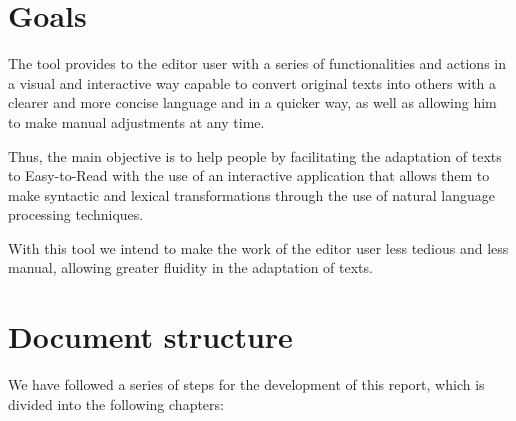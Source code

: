 \section{Goals}
The tool provides to the editor user with a series of functionalities and actions in a visual and interactive way capable to convert original texts into others with a clearer and more concise language and in a quicker way, as well as allowing him to make manual adjustments at any time. 

Thus, the main objective is to help people by facilitating the adaptation of texts to Easy-to-Read with the use of an interactive application that allows them to make syntactic and lexical transformations through the use of natural language processing techniques. 

With this tool we intend to make the work of the editor user less tedious and less manual, allowing greater fluidity in the adaptation of texts.

\section{Document structure}


We have followed a series of steps for the development of this report, which is divided into the following chapters:

